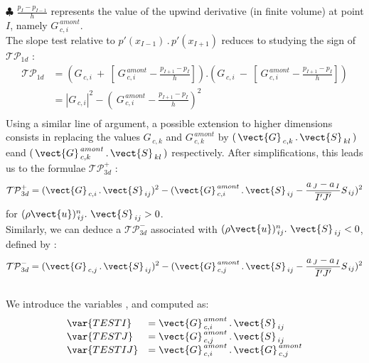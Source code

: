 {\tiny $\clubsuit$} $\displaystyle\frac{p_I - p_{I-1}}{h}$ represents the value of the
upwind derivative (in finite volume) at point $I$, namely $ G^{\,amont}_{\,c,i}$.\\
The slope test relative to $ p'(x_{I-1})\,.\,p'(x_{I+1}) $ reduces
to studying the sign of $\mathcal{TP}_{1d}$ :\\
\begin{equation}
\begin{array}{ll}
\mathcal{TP}_{1d}
&= \left(G_{\,c,i}\ +\ [\ G^{\,amont}_{\,c,i}
-\displaystyle \frac{p_{I+1} -  p_I}{h}]\right).\left(G_{\,c,i}\ -\ [\ G^{\,amont}_{\,c,i}
-\displaystyle \frac{p_{I+1} -  p_I}{h}]\right) \\
 &= |G_{\,c,i}|^2 - (\ G^{\,amont}_{\,c,i}
-\displaystyle \frac{p_{I+1} -  p_I}{h})^2\\
\end{array}
\end{equation}
Using a similar line of argument, a possible extension to higher dimensions
 consists in replacing the values $ G_{\,c,k} $  and  $ G^{\,amont}_{\,c,k} $ by
$(\,\vect{G}_{\,c,k}\,.\,\vect{S}_{\,kl}\,)$ eand
$(\,\vect{G}^{\,amont}_{\,c,k}\,.\,\vect{S}_{\,kl}\,)$ respectively. After simplifications, this leads us
to the formulae $\mathcal{TP}^{+}_{3d}$ :
\begin{equation}
\mathcal{TP}^{+}_{3d} = (\vect{G}_{\,c,i}\,.\, \vect{S}_{\,ij})^2 -
(\vect{G}^{\,amont}_{\,c,i}\,.\,\vect{S}_{\,ij} - \displaystyle\frac{a_{\,J}- a_{\,I}}{\overline{I'J'}} S_{\,ij})^2
\end{equation}
for $(\rho \vect{u})_{\,ij}^n.\ \vect{S}_{\,ij} > 0$.\\
Similarly, we can deduce a  $\mathcal{TP}^{-}_{3d}$
associated with $(\rho \vect{u})_{\,ij}^n.\ \vect{S}_{\,ij} < 0$, defined by
:\\
\begin{equation}
\mathcal{TP}^{-}_{3d} = (\vect{G}_{\,c,j}\,.\, \vect{S}_{\,ij})^2 -
(\vect{G}^{\,amont}_{\,c,j}\,.\,\vect{S}_{\,ij} - \displaystyle\frac{a_{\,J}- a_{\,I}}{\overline{I'J'}} S_{\,ij})^2
\end{equation}
\\
We introduce the variables  ,  and  computed as:
\begin{equation}
\begin{array}{lll}
\var{TESTI}&=\vect{G}^{\,amont}_{\,c,i}\,.\, \vect{S}_{\,ij}\\
\var{TESTJ}&=\vect{G}^{\,amont}_{\,c,j}\,.\, \vect{S}_{\,ij}\\
\var{TESTIJ}&=\vect{G}^{\,amont}_{\,c,i}\,.\, \vect{G}^{\,amont}_{\,c,j}\\
\end{array}
\end{equation}
